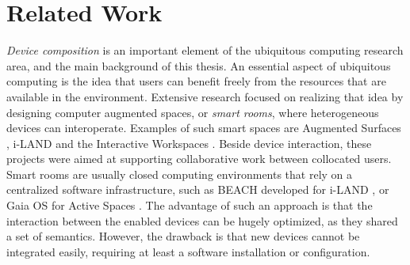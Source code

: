 \chapter{Related Work}
\label{relatedwork}



\emph{Device composition} is an important element of the ubiquitous computing research area, and the main background of this thesis.
An essential aspect of ubiquitous computing is the idea that users can benefit freely from the resources that are available in the environment.
Extensive research focused on realizing that idea by designing computer augmented spaces, or \emph{smart rooms}, where heterogeneous devices can interoperate.
Examples of such smart spaces are Augmented Surfaces \citep{Rekimoto:1999:augmentedsurfaces}, 
i-LAND \citep{Streitz:1999:iland} and the Interactive Workspaces \citep{Johanson:2002:iroom}.
Beside device interaction, these projects were aimed at supporting collaborative work between collocated users.
Smart rooms are usually closed computing environments that rely on a centralized software infrastructure, such as BEACH developed for i-LAND \citep{Tandler:2001:smartenv}, or Gaia OS for Active Spaces \citep{Roman:2002:gaia}.
The advantage of such an approach is that the interaction between the enabled devices can be hugely optimized, as they shared a set of semantics.
However, the drawback is that new devices cannot be integrated easily, requiring at least a software installation or configuration.

